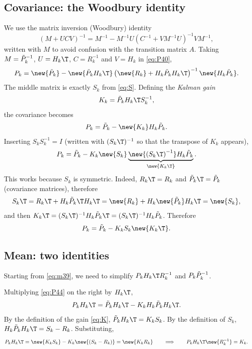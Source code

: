 \subsection{Covariance: the Woodbury identity}
We use the matrix inversion (Woodbury) identity
\begin{equation}
  (M + UCV)^{-1} = M^{-1} - M^{-1}U\left(C^{-1} + VM^{-1}U\right)^{-1}VM^{-1},
\end{equation}
written with $M$ to avoid confusion with the transition matrix $A$. Taking $M = \tilde P_k^{-1}$, $U = H_k\T$, $C = R_k^{-1}$ and $V = H_k$ in \eqref{eq:P40},
\begin{equation}
  P_k = \new{\Pt_k} - \new{\Pt_k H_k\T}\left(\new{R_k} + H_k\Pt_k H_k\T\right)^{-1}\new{H_k\Pt_k}. \label{eq:P42}
\end{equation}
The middle matrix is exactly $S_k$ from \eqref{eq:S}. Defining the \emph{Kalman gain}
\begin{equation}
  K_k = \Pt_k H_k\T S_k^{-1}, \label{eq:K}
\end{equation}
the covariance becomes
\begin{equation}
  P_k = \Pt_k - \new{K_k} H_k\Pt_k. \label{eq:P44}
\end{equation}
 Inserting $S_kS_k^{-1} = I$ (written with $(S_k\T)^{-1}$ so that the transpose of $K_k$ appears),
\begin{equation}
  P_k = \Pt_k - K_k\new{S_k}\underbrace{\new{\left(S_k\T\right)^{-1}}H_k\Pt_k}_{\new{K_k\T}}. \label{eq:P45}
\end{equation}
This works because $S_k$ is symmetric. Indeed, $R_k\T = R_k$ and $\Pt_k\T = \Pt_k$ (covariance matrices), therefore
\begin{equation}
  S_k\T = R_k\T + H_k\Pt_k\T H_k\T = \new{R_k} + H_k\new{\Pt_k} H_k\T = \new{S_k},
\end{equation}
and then $K_k\T = (S_k\T)^{-1}H_k\Pt_k\T = (S_k\T)^{-1}H_k\Pt_k$. Therefore
\begin{equation}
  P_k = \Pt_k - K_kS_k\new{K_k\T}. \label{eq:P47}
\end{equation}

\subsection{Mean: two identities}
Starting from \eqref{eq:m39}, we need to simplify $P_kH_k\T R_k^{-1}$ and $P_k\tilde P_k^{-1}$.

 Multiplying \eqref{eq:P44} on the right by $H_k\T$,
\begin{equation}
  P_kH_k\T = \Pt_kH_k\T - K_kH_k\Pt_kH_k\T. \label{eq:id1a}
\end{equation}
By the definition of the gain \eqref{eq:K}, $\Pt_kH_k\T = K_kS_k$. By the definition of $S_k$, $H_k\Pt_kH_k\T = S_k - R_k$. Substituting,
\begin{equation}
  P_kH_k\T = \new{K_kS_k} - K_k\new{(S_k - R_k)} = \new{K_kR_k} \qquad\Longrightarrow\qquad P_kH_k\T \new{R_k^{-1}} = K_k.
\end{equation}

